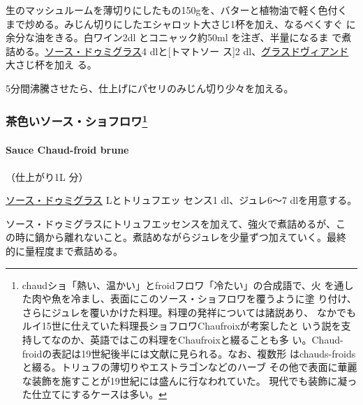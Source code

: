 \begin{recette}
生のマッシュルームを薄切りにしたもの150gを、バターと植物油で軽く色付く
まで炒める。みじん切りにしたエシャロット大さじ1杯を加え、なるべくすぐ
に余分な油をきる。白ワイン2dl とコニャック約50ml を注ぎ、半量になるま
で煮詰める。\protect\hyperlink{sauce-demi-glace}{ソース・ドゥミグラス}4
dlと{[}トマトソー ス{]}2
dl、\protect\hyperlink{glace-de-viande}{グラスドヴィアンド}大さじ\undemi{}杯を加え
る。

5分間沸騰させたら、仕上げにパセリのみじん切り少々を加える。

\maeaki

\hypertarget{ux8336ux8272ux3044ux30bdux30fcux30b9ux30b7ux30e7ux30d5ux30edux30ef15}{%
\subsubsection[茶色いソース・ショフロワ]{\texorpdfstring{茶色いソース・ショフロワ\footnote{chaudショ「熱い、温かい」とfroidフロワ「冷たい」の合成語で、火
  を通した肉や魚を冷まし、表面にこのソース・ショフロワを覆うように塗
  り付け、さらにジュレを覆いかけた料理。料理の発祥については諸説あり、
  なかでもルイ15世に仕えていた料理長ショフロワChaufroixが考案したと
  いう説を支持してなのか、英語ではこの料理をChaufroixと綴ることも多
  い。Chaud-froidの表記は19世紀後半には文献に見られる。なお、複数形
  はchauds-froidsと綴る。トリュフの薄切りやエストラゴンなどのハーブ
  その他で表面に華麗な装飾を施すことが19世紀には盛んに行なわれていた。
  現代でも装飾に凝った仕立てにするケースは多い。}}{茶色いソース・ショフロワ}}\label{ux8336ux8272ux3044ux30bdux30fcux30b9ux30b7ux30e7ux30d5ux30edux30ef15}}

\hypertarget{sauce-chaud-froid-brune}{%
\paragraph{Sauce Chaud-froid brune}\label{sauce-chaud-froid-brune}}


（仕上がり1L 分）

\protect\hyperlink{sauce-demi-glace}{ソース・ドゥミグラス}\troisquarts{}
Lとトリュフエッ センス1 dl、ジュレ6〜7 dlを用意する。

ソース・ドゥミグラスにトリュフエッセンスを加えて、強火で煮詰めるが、こ
の時に鍋から離れないこと。煮詰めながらジュレを少量ずつ加えていく。最終
的に\deuxtiers{}量程度まで煮詰める。


\end{recette}

